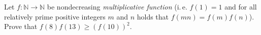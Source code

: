 \problem{}
Let $f \colon \mathbb{N} \to \mathbb{N}$ be nondecreasing \emph{multiplicative function}
(i.\,e. $f(1)=1$ and for all relatively prime positive integers $m$ and $n$ holds that $f(m n) = f(m) f(n)$).
Prove that $f(8) f(13) \geq (f(10))^2$.
\solution
\endproblem
